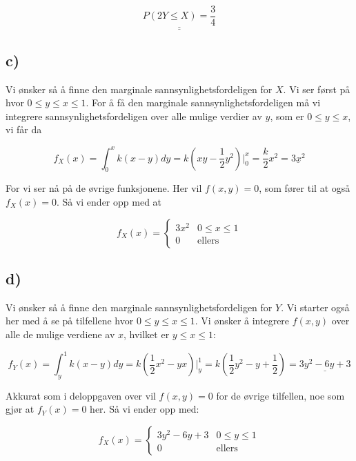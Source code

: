 \documentclass[a4paper,norsk, 10pt]{article}
\begin{document}
\begin{equation}
\underline{\underline{P(2Y \leq X) = \frac{3}{4}}}
\end{equation}

\subsection*{c)}
Vi ønsker så å finne den marginale sannsynlighetsfordeligen for $X$. Vi ser først på hvor $0 \leq y \leq x \leq 1$. For å få den marginale sannsynlighetsfordeligen må vi integrere sannsynlighetsfordeligen over alle mulige verdier av $y$, som er $0 \leq y \leq x$, vi får da

\begin{equation}
f_X(x) = \int_0^x k(x-y)dy = k\left(xy-\frac{1}{2}y^2\right)\bigg|_0^x = \frac{k}{2}x^2 = \underline{{3x^2}}
\end{equation}

For vi ser nå på de øvrige funksjonene. Her vil $f(x,y) = 0$, som fører til at også $f_X(x) = 0$. Så vi ender opp med at

\begin{equation}
f_X(x) = 
\begin{cases}
3x^2 & 0 \leq x \leq 1 \\
0 & \text{ellers}
\end{cases}
\end{equation}


\subsection*{d)}

Vi ønsker så å finne den marginale sannsynlighetsfordeligen for $Y$. Vi starter også her med å se på tilfellene hvor $0 \leq y \leq x \leq 1$. Vi ønsker å integrere $f(x,y)$ over alle de mulige verdiene av $x$, hvilket er $y\leq x \leq 1$:

\begin{equation}
f_Y(x) = \int_y^1 k(x-y)dy = k\left(\frac{1}{2}x^2 - yx\right)\bigg|_y^1 = k\left(\frac{1}{2}y^2 - y + \frac{1}{2}\right) = \underline{3y^2 - 6y + 3}
\end{equation}

Akkurat som i deloppgaven over vil $f(x,y) = 0$ for de øvrige tilfellen, noe som gjør at $f_Y(x) = 0$ her. Så vi ender opp med:

\begin{equation}
f_X(x) = 
\begin{cases}
3y^2 - 6y + 3 & 0 \leq y \leq 1 \\
0 & \text{ellers}
\end{cases}
\end{equation}
\end{document}
